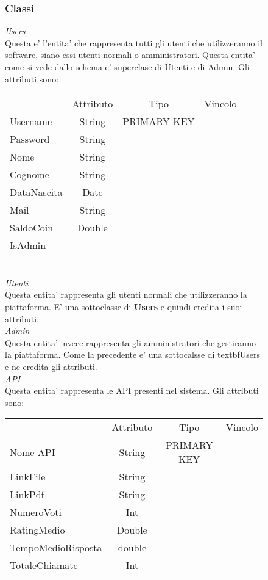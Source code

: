 {{\begin{figure}[ht]
			\subsubsection{Classi}
			\textit{Users}\\
			Questa e' l'entita' che rappresenta tutti gli utenti che utilizzeranno il software, siano essi utenti normali o amministratori. Questa entita' come si vede dallo schema e' superclase di Utenti e di Admin. Gli attributi sono: 
			\begin{center}
			\begin{tabular}{lccc}
				&Attributo&Tipo&Vincolo\\
				Username&String&PRIMARY KEY\\
				Password&String& \\
				Nome&String& \\
				Cognome&String& \\
				DataNascita&Date& \\
				Mail&String& \\
				SaldoCoin&Double& \\
				IsAdmin
			\end{tabular}
			\end{center} \\
			\textit{Utenti}\\
			Questa entita' rappresenta gli utenti normali che utilizzeranno la piattaforma. E' una sottoclasse di \textbf{Users} e quindi eredita i suoi attributi.  \\
			\textit{Admin}\\
			Questa entita' invece rappresenta gli amministratori che gestiranno la piattaforma. Come la precedente e' una sottocalsse di textbf{Users} e ne eredita gli attributi. \\
			\textit{API}\\
			Questa entita' rappresenta le API presenti nel sistema. Gli attributi sono:
			\begin{center}
			\begin{tabular}{lccc}
				&Attributo&Tipo&Vincolo\\
				Nome API&String&PRIMARY KEY\\
				LinkFile&String& \\
				LinkPdf&String& \\
				NumeroVoti&Int& \\
				RatingMedio&Double& \\
				TempoMedioRisposta&double& \\
				TotaleChiamate&Int& \\

\end{tabular}
\end{center}
\end{figure}}}
